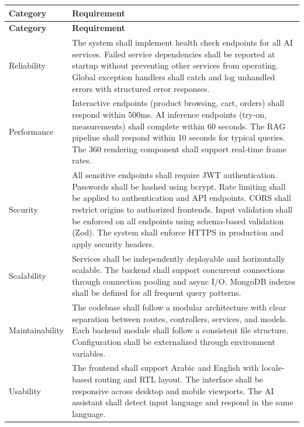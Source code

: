 \begin{longtable}{p{3.5cm} p{10cm}}
\toprule
\textbf{Category} & \textbf{Requirement} \\
\midrule
\endfirsthead
\toprule
\textbf{Category} & \textbf{Requirement} \\
\midrule
\endhead
\bottomrule
\endfoot

Reliability &
The system shall implement health check endpoints for all AI services. Failed service dependencies shall be reported at startup without preventing other services from operating. Global exception handlers shall catch and log unhandled errors with structured error responses. \\

Performance &
Interactive endpoints (product browsing, cart, orders) shall respond within 500ms. AI inference endpoints (try-on, measurements) shall complete within 60 seconds. The RAG pipeline shall respond within 10 seconds for typical queries. The 360 rendering component shall support real-time frame rates. \\

Security &
All sensitive endpoints shall require JWT authentication. Passwords shall be hashed using bcrypt. Rate limiting shall be applied to authentication and API endpoints. CORS shall restrict origins to authorized frontends. Input validation shall be enforced on all endpoints using schema-based validation (Zod). The system shall enforce HTTPS in production and apply security headers. \\

Scalability &
Services shall be independently deployable and horizontally scalable. The backend shall support concurrent connections through connection pooling and async I/O. MongoDB indexes shall be defined for all frequent query patterns. \\

Maintainability &
The codebase shall follow a modular architecture with clear separation between routes, controllers, services, and models. Each backend module shall follow a consistent file structure. Configuration shall be externalized through environment variables. \\

Usability &
The frontend shall support Arabic and English with locale-based routing and RTL layout. The interface shall be responsive across desktop and mobile viewports. The AI assistant shall detect input language and respond in the same language. \\

\end{longtable}

